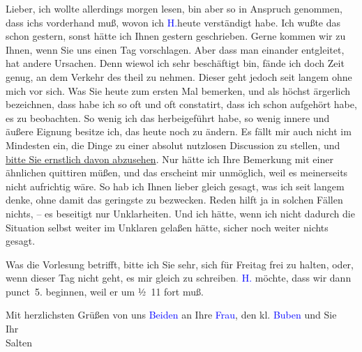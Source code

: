 \pstart
           Lieber, ich wollte allerdings morgen
               lesen, bin aber so in Anspruch genommen, dass ichs vorderhand \label{K_L03347-1v}\label{K_L03347-1h} muß, wovon ich \textcolor{blue}{H.}{}\ledrightnote{\textcolor{blue}{Hugo von Hofmannsthal}}{ }heute verständigt habe. Ich wußte das schon gestern, sonst hätte ich Ihnen gestern geschrieben. Gerne kommen wir zu Ihnen, wenn Sie uns einen Tag
               vorschlagen. Aber dass man einander entgleitet, hat andere Ursachen. Denn wiewol ich
               sehr beschäftigt bin, fände ich doch Zeit genug, an dem Verkehr des \label{K_L03347-2v}\label{K_L03347-2h} theil zu nehmen. Dieser geht jedoch seit langem ohne mich vor sich. Was Sie
                  heute zum ersten Mal bemerken, und als höchst
               ärgerlich bezeichnen, dass habe ich so oft und oft constatirt, dass ich schon
               aufgehört habe, es zu beobachten. So wenig ich das herbeigeführt habe, so wenig
               innere und äußere Eignung besitze ich, das heute noch zu ändern. Es fällt mir auch
               nicht im Mindesten ein, die Dinge zu einer absolut nutzlosen Discussion zu stellen,
               und \uline{bitte Sie ernstlich davon abzusehen}. Nur hätte
               ich Ihre Bemerkung mit einer ähnlichen quittiren müßen, und das erscheint mir
               unmöglich, weil es meinerseits nicht aufrichtig wäre. So hab ich Ihnen lieber gleich
               gesagt, was ich seit langem denke, ohne damit das geringste zu bezwecken. Reden hilft
               ja in solchen Fällen nichts, – es beseitigt nur Unklarheiten. Und ich hätte, wenn ich
               nicht dadurch die Situation selbst weiter im Unklaren gelaßen hätte, sicher noch
               weiter nichts gesagt.\pend
           
\pstart
           {\pb}Was die Vorlesung betrifft,
               bitte ich Sie sehr, sich für Freitag frei zu halten,
               oder, wenn dieser Tag nicht geht, es mir gleich zu schreiben\textcolor{gray}{.}{ }\textcolor{blue}{H.}{}\ledrightnote{\textcolor{blue}{Hugo von Hofmannsthal}} möchte, dass wir dann punct 5.
               beginnen, weil er um ½ 11 fort muß.\pend
           
\pstart
           Mit herzlichsten Grüßen von uns \textcolor{blue}{Beiden}{}\ledrightnote{{$\rightarrow$}\textcolor{blue}{Ottilie Salten}} an Ihre \textcolor{blue}{Frau}{}\ledrightnote{{$\rightarrow$}\textcolor{blue}{Olga Schnitzler}},
               den kl. \textcolor{blue}{Buben}{}\ledrightnote{{$\rightarrow$}\textcolor{blue}{Heinrich Schnitzler}} und Sie
               {\\}Ihr {\\}\spacefill\mbox{Salten}\pend
           \endnumbering{}  
      